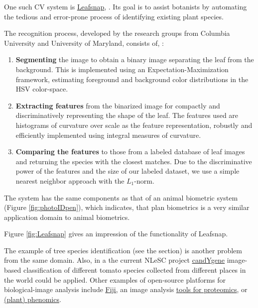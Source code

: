 One such CV system is \href{http://neerajkumar.org/projects/leafsnap/}{\underline{Leafsnap}}, \cite{leafsnap}. Its goal is to assist botanists by automating the tedious and error-prone process of identifying existing plant species. 

The recognition process, developed by the research groups from Columbia University and University of Maryland, consists of, \cite{leafsnap_eccv2012}:
\begin{enumerate}
\item{ {\bf Segmenting} the image to obtain a binary image separating the leaf from the background. This is implemented using an Expectation-Maximization framework, estimating foreground and background color distributions in the HSV color-space.}
\item{{\bf Extracting features} from the binarized image for compactly and discriminatively representing the shape of the leaf. The features used are histograms of curvature over scale as the feature representation, robustly and efficiently implemented using integral measures of curvature.}
\item{{\bf Comparing the features} to those from a labeled database of leaf images and returning the species with the closest matches. Due to the discriminative power of the features and the size of our labeled dataset, we use a simple nearest neighbor approach with the $L_1$-norm.}
\end{enumerate}
The system has the same components as that of an animal biometric system (Figure \ref{fig:photoIDpen}), which indicates, that plan biometrics is a very similar application domain to animal biometrics.

Figure \ref{fig:Leafsnap} gives an impression of the functionality of Leafsnap.

The example of tree species identification (see the \underline{} section) is another problem from the same domain. Also, in a the current NLeSC project \href{https://www.esciencecenter.nl/project/prediction-of-candidate-genes-for-traits-using-interoperable-genome-annotat}{\underline{candYgene}} image-based classification of different tomato species collected from different places in the world could be applied. Other examples of open-source platforms for biological-image analysis include \href{http://www.nature.com/nmeth/journal/v9/n7/full/nmeth.2019.html}{\underline{Fiji}}, an image analysis \href{http://onlinelibrary.wiley.com/doi/10.1002/pmic.200900635/abstract;jsessionid=1EFBED6E2050FF3D4670B844BFA98970.f02t01}{\underline{tools for proteomics}}, or 
 \href{http://www.plantphysiol.org/content/168/4/1476.short?rss=1}{\underline{(plant) phenomics}}.

